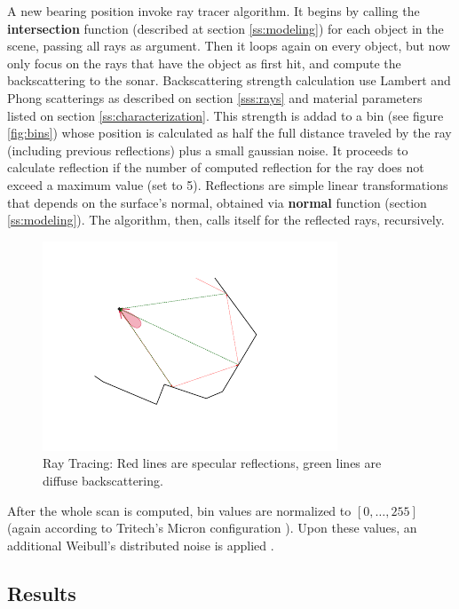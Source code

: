A new bearing position invoke ray tracer algorithm. It begins by calling
the \textbf{intersection} function (described at section \ref{ss:modeling}) for
each object in the scene, passing all rays as argument. Then it loops again on every
object, but now only focus on the rays that have the object as first hit, and
compute the backscattering to the sonar. Backscattering strength calculation use
Lambert and Phong scatterings as described on section \ref{sss:rays} and material
parameters listed on section \ref{ss:characterization}. This strength is addad
to a bin (see figure \ref{fig:bins}) whose position is calculated as half the full
distance traveled by the ray (including previous reflections) plus a small
gaussian noise. It proceeds to calculate reflection if the number of computed
reflection for the ray does not exceed a maximum value (set to 5). Reflections
are simple linear transformations that depends on the surface's normal, obtained
via \textbf{normal} function (section \ref{ss:modeling}). The algorithm, then,
calls itself for the reflected rays, recursively.

\begin{figure}
	\centering
	\includegraphics[scale=2.5, trim={20 20 20 20}, clip]{Chap2/fig/method.pdf}
	\caption{Ray Tracing: Red lines are specular reflections, green lines are diffuse backscattering.}
	\label{fig:methodtrace}
\end{figure}

After the whole scan is computed, bin values are normalized to $[0,\ldots,255]$
(again according to Tritech's Micron configuration ). Upon these values, an
additional Weibull's distributed noise is applied \cite{maussang2007mean}.

\subsection{Results}
\label{ss:results}

